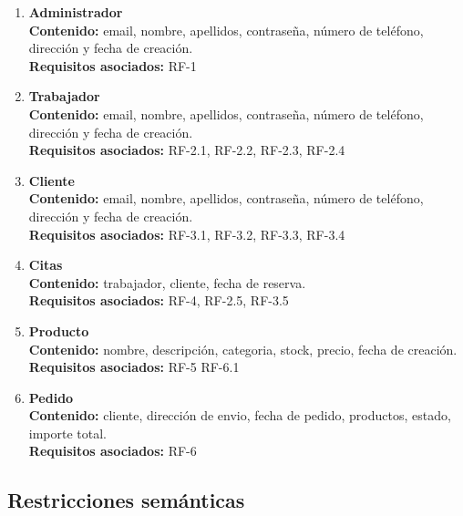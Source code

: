 \begin{enumerate}[leftmargin=1.6cm,start=1,label={\bfseries RI-\arabic*.}]
\setlength\itemsep{1em} %
    \item \textbf{Administrador}
    \\\textbf{Contenido:} email, nombre, apellidos, contraseña, número de teléfono, dirección y fecha de creación.
	\\\textbf{Requisitos asociados:} RF-1

	\item \textbf{Trabajador}
    \\\textbf{Contenido:} email, nombre, apellidos, contraseña, número de teléfono, dirección y fecha de creación.
    \\\textbf{Requisitos asociados:} RF-2.1, RF-2.2, RF-2.3, RF-2.4

    \item \textbf{Cliente}
    \\\textbf{Contenido:} email, nombre, apellidos, contraseña, número de teléfono, dirección y fecha de creación.
    \\\textbf{Requisitos asociados:} RF-3.1, RF-3.2, RF-3.3, RF-3.4

    \item \textbf{Citas}
    \\\textbf{Contenido:} trabajador, cliente, fecha de reserva.
    \\\textbf{Requisitos asociados:} RF-4, RF-2.5, RF-3.5\\
    
    \item \textbf{Producto}
    \\\textbf{Contenido:} nombre, descripción, categoria, stock, precio, fecha de creación.
    \\\textbf{Requisitos asociados:} RF-5 RF-6.1\\
    
    \item \textbf{Pedido}
    \\\textbf{Contenido:} cliente, dirección de envio, fecha de pedido, productos, estado, importe total.
    \\\textbf{Requisitos asociados:} RF-6\\
\end{enumerate}

\subsection{Restricciones semánticas}

